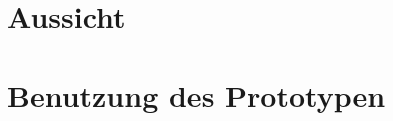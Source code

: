 \section{Aussicht}


\clearpage
\section{Benutzung des Prototypen}



\nocite{GitHubGettingStartedHubot}
\nocite{BotkitBotkitToolkitbuilding}
\nocite{SlackConversationsAPI}
